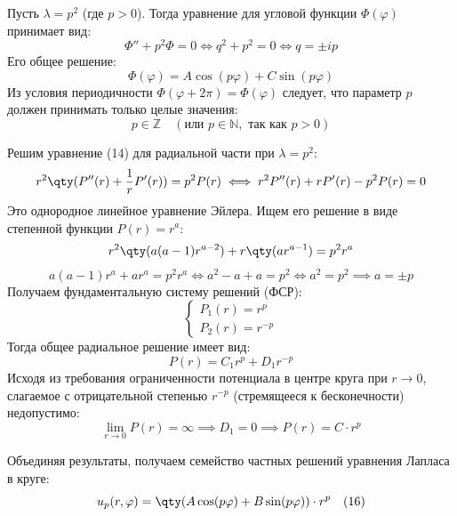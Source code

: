 \begin{example}
	Пусть $\lambda = p^2$ (где $p > 0$).
	Тогда уравнение для угловой функции $\Phi(\varphi)$ принимает вид:
	\begin{equation*}
		\Phi'' + p^2 \Phi = 0 \iff q^2 + p^2 = 0 \iff q = \pm ip
	\end{equation*}
	Его общее решение:
	\begin{equation*}
		\Phi(\varphi) = A\cos(p\varphi) + C\sin(p\varphi)
	\end{equation*}
	Из условия периодичности $\Phi(\varphi + 2\pi) = \Phi(\varphi)$ следует, что параметр $p$ должен принимать только целые значения:
	\begin{equation*}
		p \in \mathbb{Z} \quad (\text{или } p \in \mathbb{N}, \text{ так как } p > 0)
	\end{equation*}
	
	Решим уравнение (14) для радиальной части при $\lambda = p^2$:
	\begin{equation*}
		r^2\qty(P''(r) + \frac{1}{r}P'(r)) = p^2 P(r) \iff r^2 P''(r) + r P'(r) - p^2 P(r) = 0
	\end{equation*}
	Это однородное линейное уравнение Эйлера. Ищем его решение в виде степенной функции $P(r) = r^a$:
	\begin{equation*}
		r^2 \qty( a(a-1)r^{a-2} ) + r \qty( a r^{a-1} ) = p^2 r^a
	\end{equation*}
	\begin{equation*}
		a(a-1)r^a + a r^a = p^2 r^a \iff a^2 - a + a = p^2 \iff a^2 = p^2 \implies a = \pm p
	\end{equation*}
	Получаем фундаментальную систему решений (ФСР):
	\begin{equation*}
		\begin{cases}
			P_1(r) = r^p \\
			P_2(r) = r^{-p}
		\end{cases}
		\end{equation*}
		Тогда общее радиальное решение имеет вид:
		\begin{equation*}
			P(r) = C_1 r^p + D_1 r^{-p}
		\end{equation*}
		Исходя из требования ограниченности потенциала в центре круга при $r \to 0$, слагаемое с отрицательной степенью $r^{-p}$ (стремящееся к бесконечности) недопустимо:
		\begin{equation*}
			\lim_{r\to 0} P(r) = \infty \implies D_1 = 0 \implies P(r) = C \cdot r^p
		\end{equation*}
		
		Объединяя результаты, получаем семейство частных решений уравнения Лапласа в круге:
		\begin{equation} \label{eq:laplace_particular}
			u_p(r,\varphi) = \qty( A \cos(p\varphi) + B \sin(p\varphi) ) \cdot r^p \quad (16)
		\end{equation}
	\end{example}
